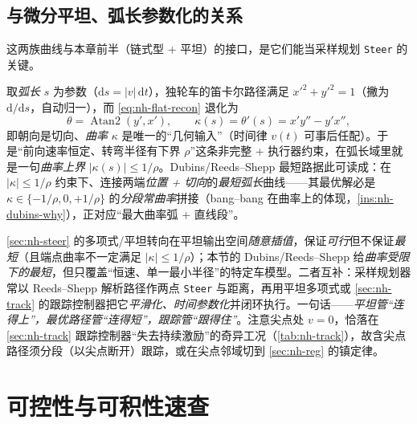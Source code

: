 \subsection{与微分平坦、弧长参数化的关系}
\label{sec:nh-optpath-flat}

这两族曲线与本章前半（链式型 + 平坦）的接口，是它们能当采样规划 \texttt{Steer} 的关键。

\begin{insight}\label{ins:nh-arclength}
取\emph{弧长} $s$ 为参数（$\mathrm{d}s=|v|\,\mathrm{d}t$），独轮车的笛卡尔路径满足 $x'^2+y'^2=1$（撇为 $\mathrm{d}/\mathrm{d}s$，自动归一），而 \cref{eq:nh-flat-recon} 退化为
\begin{equation}
  \theta=\operatorname{Atan2}(y',x'),\qquad \kappa(s)=\theta'(s)=x'y''-y'x'' ,
  \label{eq:nh-arclength-curv}
\end{equation}
即朝向是切向、\emph{曲率} $\kappa$ 是唯一的“几何输入”（时间律 $v(t)$ 可事后任配）。于是“前向速率恒定、转弯半径有下界 $\rho$”这条非完整 + 执行器约束，在弧长域里就是一句\emph{曲率上界} $|\kappa(s)|\le1/\rho$。Dubins/Reeds--Shepp 最短路据此可读成：在 $|\kappa|\le1/\rho$ 约束下、连接两端\emph{位置 + 切向}的\emph{最短弧长}曲线——其最优解必是 $\kappa\in\{-1/\rho,0,+1/\rho\}$ 的\emph{分段常曲率}拼接（bang--bang 在曲率上的体现，\cref{ins:nh-dubins-why}），正对应“最大曲率弧 + 直线段”。
\end{insight}

\begin{note}\label{note:nh-steer-synthesis}
\cref{sec:nh-steer} 的多项式/平坦转向在平坦输出空间\emph{随意插值}，保证\emph{可行}但不保证\emph{最短}（且端点曲率不一定满足 $|\kappa|\le1/\rho$）；本节的 Dubins/Reeds--Shepp 给\emph{曲率受限下的最短}，但只覆盖“恒速、单一最小半径”的特定车模型。二者互补：采样规划器常以 Reeds--Shepp 解析路径作两点 \texttt{Steer} 与距离，再用平坦多项式或 \cref{sec:nh-track} 的跟踪控制器把它\emph{平滑化、时间参数化}并闭环执行。一句话——\emph{平坦管“连得上”，最优路径管“连得短”，跟踪管“跟得住”}。注意尖点处 $v=0$，恰落在 \cref{sec:nh-track} 跟踪控制器“失去持续激励”的奇异工况（\cref{tab:nh-track}），故含尖点路径须分段（以尖点断开）跟踪，或在尖点邻域切到 \cref{sec:nh-reg} 的镇定律。
\end{note}

\section{可控性与可积性速查}
\label{sec:nh-quickguide}

